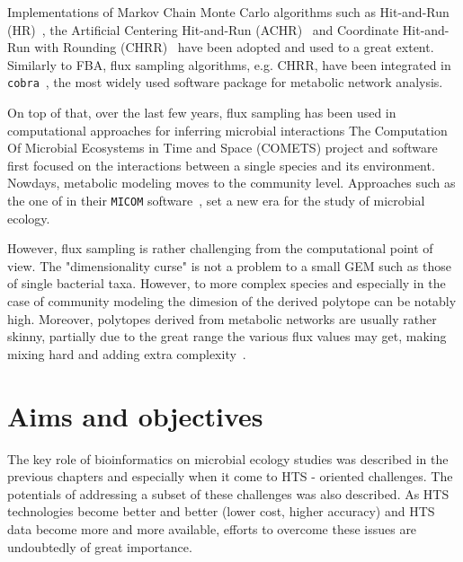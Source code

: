       Implementations of Markov Chain Monte Carlo algorithms such as 
      Hit-and-Run (HR)~\citep{smith84},  
      the Artificial Centering Hit-and-Run
      (ACHR)~\citep{kaufman1998direction} 
      and Coordinate Hit-and-Run with Rounding
      (CHRR)~\citep{Haraldsdottir17}
      have been adopted and used to a great extent. 
      Similarly to FBA, flux sampling algorithms, e.g. CHRR, have been integrated in \texttt{cobra}~\citep{heirendt2019creation},
      the most widely used 
      software package for metabolic network analysis.

      On top of that, over the last few years, flux sampling has been 
      used in computational approaches for inferring microbial interactions 
      The Computation Of Microbial Ecosystems in Time and Space (COMETS) project and software~\citep{dukovski2021metabolic}
      first focused on the interactions between a single species and its environment. 
      Nowdays, metabolic modeling moves to the community level. 
      Approaches such as the one of \citeauthor{diener2020micom} in their \texttt{MICOM}
      software~\citep{diener2020micom}, set a new era for the study of microbial ecology. 
      
      
      However, flux sampling is rather challenging from the computational point of view. 
      The "dimensionality curse" is not a problem to a small GEM such as those of single bacterial taxa.
      However, to more complex species and especially in the case of community modeling 
      the dimesion of the derived polytope can be notably high. 
      Moreover, polytopes derived from metabolic networks are usually rather skinny,
      partially due to the great range the various flux values may get, 
      making mixing hard and 
      adding extra complexity~\citep{Haraldsdottir17,schellenberger2009use}. 


      
\section{Aims and objectives}

   The key role of bioinformatics on microbial ecology studies
   was described in the previous chapters and especially 
   when it come to HTS - oriented challenges. 
   The potentials of addressing a subset of these challenges was also 
   described. 
   As HTS technologies become better and better 
   (lower cost, higher accuracy)
   and HTS data become more and more available, 
   efforts to overcome these issues 
   are undoubtedly of great importance. 



